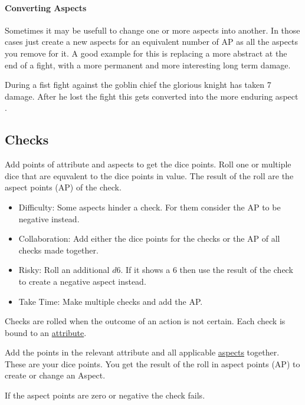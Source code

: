 \documentclass[11pt]{article}
\begin{document}
{\paragraph*{Converting Aspects}
\label{sec:orgef00708}

Sometimes it may be usefull to change one or more aspects into another. In those cases just create a new aspects for an equivalent number of AP as all the aspects you remove for it.
A good example for this is replacing a more abstract  at the end of a fight, with a more permanent and more interesting long term damage.

\begin{pwexample}
During a fist fight against the goblin chief the glorious knight has taken 7 damage. After he lost the fight this gets converted into the more enduring aspect . 
\end{pwexample}
\subsection{Checks}
\label{sec:org6437075}
\begin{short}
Add points of attribute and aspects to get the dice points. Roll one or multiple dice that are equvalent to the dice points in value. The result of the roll are the aspect points (AP) of the check.
\begin{itemize}
\item Difficulty: Some aspects hinder a check. For them consider the AP to be negative instead.
\item Collaboration: Add either the dice points for the checks or the AP of all checks made together.
\item Risky: Roll an additional \(d6\). If it shows a \(6\) then use the result of the check to create a negative aspect instead.
\item Take Time: Make multiple checks and add the AP.
\end{itemize}
\end{short}

Checks are rolled when the outcome of an action is not certain. Each check is bound to an \hyperref[sec:orgb96d653]{attribute}.

Add the points in the relevant attribute and all applicable \hyperref[sec:org43144d2]{aspects} together. These are your dice points. You get the result of the roll in aspect points (AP) to create or change an Aspect.

If the aspect points are zero or negative the check fails.

}
\end{document}

